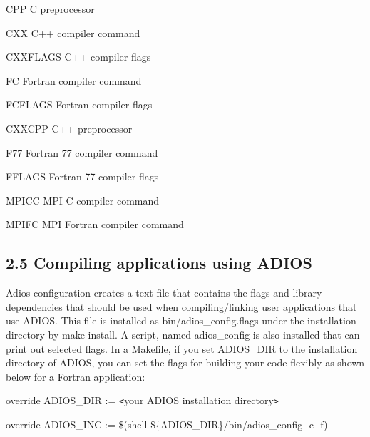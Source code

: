 \vspace{10pt}
\parindent=7pt
CPP       C preprocessor

\vspace{10pt}
CXX       C++ compiler command

\vspace{10pt}
\parindent=14pt
CXXFLAGS  C++ compiler flags

\vspace{10pt}
\parindent=7pt
FC        Fortran compiler command

\vspace{10pt}
FCFLAGS   Fortran compiler flags

\vspace{10pt}
\parindent=14pt
CXXCPP    C++ preprocessor

\vspace{10pt}
\parindent=7pt
F77       Fortran 77 compiler command

\vspace{10pt}
FFLAGS    Fortran 77 compiler flags

\vspace{10pt}
\parindent=14pt
MPICC     MPI C compiler command

\vspace{10pt}
\parindent=7pt
MPIFC     MPI Fortran compiler command\label{HRef182456360}\label{HToc182553346}

\vspace{22pt}
\subsection*{{\large 2.5 }{\large \textbf{Compiling applications using ADIOS}}}

\vspace{10pt}
\parindent=0pt
Adios configuration creates a text file that contains the flags and library dependencies 
that should be used when compiling/linking user applications that use ADIOS. This 
file is installed as bin/adios\_config.flags under the installation directory by 
make install. A script, named adios\_config is also installed that can print out 
selected flags. In a Makefile, if you set ADIOS\_DIR to the installation directory 
of ADIOS, you can set the flags for building your code flexibly as shown below 
for a Fortran application: 

\vspace{10pt}
override ADIOS\_DIR := \texttt{<}your ADIOS installation directory\texttt{>}

\vspace{10pt}
override ADIOS\_INC := \$(shell \$\{ADIOS\_DIR\}/bin/adios\_config -c -f)


